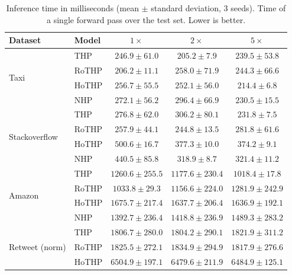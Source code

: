 \begin{table}[h!]
\centering
\caption{Inference time in milliseconds (mean $\pm$ standard deviation, 3 seeds). Time of a single forward pass over the test set. Lower is better.}
\label{tab:tempo-inferencia}
\begin{tabular}{llccc}
\toprule
Dataset & Model & $1\times$ & $2\times$ & $5\times$ \\
\midrule
\multirow{4}{*}{Taxi}
    & THP    & $246.9 \pm 61.0$ & $205.2 \pm 7.9$ & $239.5 \pm 53.8$ \\
    & RoTHP  & $206.2 \pm 11.1$ & $258.0 \pm 71.9$ & $244.3 \pm 66.6$ \\
    & HoTHP  & $256.7 \pm 55.5$ & $252.1 \pm 56.0$ & $214.4 \pm 6.8$ \\
    & NHP    & $272.1 \pm 56.2$ & $296.4 \pm 66.9$ & $230.5 \pm 15.5$ \\
\midrule
\multirow{4}{*}{Stackoverflow}
    & THP    & $276.8 \pm 62.0$ & $306.2 \pm 80.1$ & $231.8 \pm 7.5$ \\
    & RoTHP  & $257.9 \pm 44.1$ & $244.8 \pm 13.5$ & $281.8 \pm 61.6$ \\
    & HoTHP  & $500.6 \pm 16.7$ & $377.3 \pm 10.0$ & $374.2 \pm 9.1$ \\
    & NHP    & $440.5 \pm 85.8$ & $318.9 \pm 8.7$ & $321.4 \pm 11.2$ \\
\midrule
\multirow{4}{*}{Amazon}
    & THP    & $1260.6 \pm 255.5$ & $1177.6 \pm 230.4$ & $1018.4 \pm 17.8$ \\
    & RoTHP  & $1033.8 \pm 29.3$ & $1156.6 \pm 224.0$ & $1281.9 \pm 242.9$ \\
    & HoTHP  & $1675.7 \pm 217.4$ & $1637.7 \pm 206.4$ & $1636.9 \pm 192.1$ \\
    & NHP    & $1392.7 \pm 236.4$ & $1418.8 \pm 236.9$ & $1489.3 \pm 283.2$ \\
\midrule
\multirow{3}{*}{Retweet (norm)}
    & THP    & $1806.7 \pm 280.0$ & $1804.2 \pm 290.1$ & $1821.9 \pm 311.2$ \\
    & RoTHP  & $1825.5 \pm 272.1$ & $1834.9 \pm 294.9$ & $1817.9 \pm 276.6$ \\
    & HoTHP  & $6504.9 \pm 197.1$ & $6479.6 \pm 211.9$ & $6484.9 \pm 125.1$ \\
\bottomrule
\end{tabular}
\end{table}
